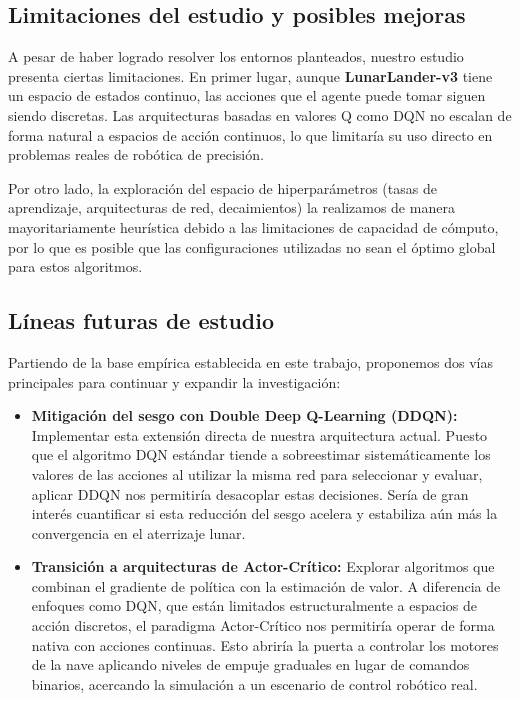 \subsection{Limitaciones del estudio y posibles mejoras}

A pesar de haber logrado resolver los entornos planteados, nuestro estudio presenta ciertas limitaciones. 
En primer lugar, aunque \textbf{LunarLander-v3} tiene un espacio de estados continuo, las acciones que 
el agente puede tomar siguen siendo discretas. Las arquitecturas basadas en valores Q como DQN no escalan 
de forma natural a espacios de acción continuos, lo que limitaría su uso directo en problemas reales de 
robótica de precisión.

Por otro lado, la exploración del espacio de hiperparámetros (tasas de aprendizaje, arquitecturas de 
red, decaimientos) la realizamos de manera mayoritariamente heurística debido a las limitaciones de 
capacidad de cómputo, por lo que es posible que las configuraciones utilizadas no sean el óptimo 
global para estos algoritmos.

\subsection{Líneas futuras de estudio} 

Partiendo de la base empírica establecida en este trabajo, proponemos dos vías principales para continuar y expandir la investigación:

\begin{itemize}
    \item \textbf{Mitigación del sesgo con Double Deep Q-Learning (DDQN):} Implementar esta extensión 
    directa de nuestra arquitectura actual. Puesto que el algoritmo DQN estándar tiende a sobreestimar sistemáticamente los valores de las acciones al utilizar la misma red para seleccionar y evaluar, aplicar DDQN nos permitiría desacoplar estas decisiones. Sería de gran interés cuantificar si esta reducción del sesgo acelera y estabiliza aún más la convergencia en el aterrizaje lunar.
    
    \item \textbf{Transición a arquitecturas de Actor-Crítico:} Explorar algoritmos que combinan el 
    gradiente de política con la estimación de valor. A diferencia de enfoques como DQN, que están 
    limitados estructuralmente a espacios de acción discretos, el paradigma Actor-Crítico nos permitiría 
    operar de forma nativa con acciones continuas.  Esto abriría la puerta a controlar los motores de 
    la nave aplicando niveles de empuje graduales en lugar de comandos binarios, acercando la simulación 
    a un escenario de control robótico real.
\end{itemize}